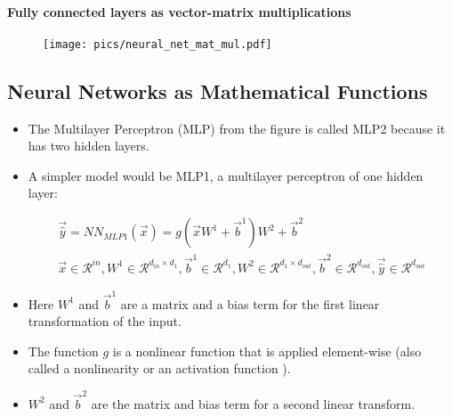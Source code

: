 

\paragraph{Fully connected layers as vector-matrix multiplications}
\begin{figure}[htb]
	\centering
	 \texttt{[image: pics/neural\_net\_mat\_mul.pdf]}
\end{figure}



\subsection{Neural Networks as Mathematical Functions}
\begin{itemize}
\item The Multilayer Perceptron (MLP) from the figure is called MLP2 because it has two hidden layers.
\item A simpler model would be MLP1, a multilayer perceptron of one hidden layer:
\begin{center}
\begin{equation}
\begin{split}
\vec{\hat{y}} = NN_{MLP1}(\vec{x}) = g(\vec{x}W^{1}+\vec{b}^{1})W^{2}+\vec{b}^{2} \\
\vec{x} \in \mathcal{R}^{in}, W^{1} \in \mathcal{R}^{d_{in}\times d_{1}}, \vec{b}^{1} \in \mathcal{R}^{d_{1}}, W^{2} \in \mathcal{R}^{d_{1}\times d_{out}}, \vec{b}^{2} \in \mathcal{R}^{d_{out}}, \vec{\hat{y}} \in \mathcal{R}^{d_{out}}    
\end{split}
\end{equation}
\end{center}

\item Here $W^{1}$ and $\vec{b}^{1}$ are a matrix and a bias term for the first linear transformation of the input.
\item The function $g$ is a nonlinear function that is applied element-wise (also called a nonlinearity or an activation function ).
\item $W^{2}$ and $\vec{b}^{2}$ are the matrix and bias term for a second linear transform.


\end{itemize}
